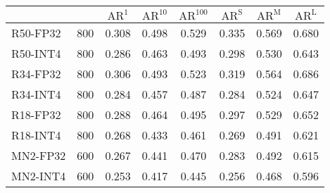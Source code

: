 \documentclass[
]{shtthesis}
\begin{document}
\begin{table}[p]
\begin{subtable}[t]{\columnwidth}
\begin{tabular}{lc*{6}{c}}
      & & $\mathrm{AR}^{1}$ & $\mathrm{AR}^{10}$ & $\mathrm{AR}^{100}$ &
      $\mathrm{AR} ^ {\mathrm{S}}$ & $\mathrm{AR} ^ {\mathrm{M}}$ & $\mathrm{AR} ^ {\mathrm{L}}$ \\
      \midrule
      R50-FP32 & 800 &0.308 &0.498 &0.529 &0.335 &0.569 &0.680 \\
      R50-INT4 & 800 &0.286 &0.463 &0.493 &0.298 &0.530 &0.643 \\
      \hdashline
      R34-FP32 & 800 &0.306 &0.493 &0.523 &0.319 &0.564 &0.686 \\
      R34-INT4 & 800 &0.284 &0.457 &0.487 &0.284 &0.524 &0.647 \\
      \hdashline
      R18-FP32 & 800 &0.288 &0.464 &0.495 &0.297 &0.529 &0.652 \\
      R18-INT4 & 800 &0.268 &0.433 &0.461 &0.269 &0.491 &0.621 \\
      \hdashline
      MN2-FP32 & 600 &0.267 &0.441 &0.470 &0.283 &0.492 &0.615 \\
      MN2-INT4 & 600 &0.253 &0.417 &0.445 &0.256 &0.468 &0.596 \\
      \bottomrule
    \end{tabular}
  \end{subtable}
\end{table}
\end{document}
